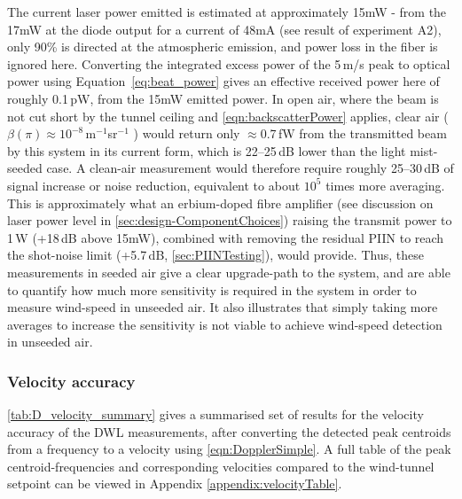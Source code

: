 The current laser power emitted is estimated at approximately 15mW - from the 17mW at the diode output for a current of 48mA (see result of experiment A2), only 90\% is directed at the atmospheric emission, and power loss in the fiber is ignored here. Converting the integrated excess power of the 5\,m/s peak to optical power
using Equation~\ref{eq:beat_power} gives an effective received power here of
roughly 0.1\,pW, from the 15mW emitted power. In open air, where the beam is not cut short by the tunnel
ceiling and \autoref{eqn:backscatterPower} applies, clear air
($\beta(\pi) \approx 10^{-8}$\,m$^{-1}$sr$^{-1}$ \cite{hill_remote_nodate}) would return only
$\approx$0.7\,fW from the transmitted beam by this system in its current form, which is 22--25\,dB lower than the light mist-seeded case. A clean-air measurement would therefore require roughly 25--30\,dB of signal increase or noise reduction, equivalent to about $10^5$ times more averaging. This is approximately what an
erbium-doped fibre amplifier (see discussion on laser power level in \autoref{sec:design-ComponentChoices}) raising the transmit power to 1\,W (+18\,dB above 15mW),
combined with removing the residual PIIN to reach the shot-noise limit
(+5.7\,dB, \autoref{sec:PIINTesting}), would provide. Thus, these measurements in seeded air give a clear upgrade-path to the system, and are able to quantify how much more sensitivity is required in the system in order to measure wind-speed in unseeded air. It also illustrates that simply taking more averages to increase the sensitivity is not viable to achieve wind-speed detection in unseeded air. 



\subsubsection{Velocity accuracy}

\autoref{tab:D_velocity_summary} gives a summarised set of results for the velocity accuracy of the DWL measurements, after converting the detected peak centroids from a frequency to a velocity using \autoref{eqn:DopplerSimple}. A full table of the peak centroid-frequencies and corresponding velocities  compared to the wind-tunnel setpoint can be viewed in Appendix \ref{appendix:velocityTable}. 

